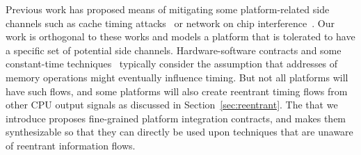 Previous work has proposed means of mitigating some platform-related side channels such as cache timing attacks~\cite{kar2023mitigating,saileshwar2021mirage,giner2023scatter,werner2019scattercache,qureshi2018ceaser} or network on chip interference~\cite{wassel2013surfnoc,wang2012efficient,schoeberl2012statically,wassel2014networks,psarras2015phasenoc,alonso2019low,sadeghi2019toward,shalaby2021sentry}.
Our work is orthogonal to these works and models a platform that is tolerated to have a specific set of potential side channels.
Hardware-software contracts and some constant-time techniques~\cite{guarnieri2021hardware,wang2023specification,tan2025contractshadowlogic} typically consider the assumption that addresses of memory operations might eventually influence timing.
But not all platforms will have such flows, and some platforms will also create reentrant timing flows from other CPU output signals as discussed in Section~\ref{sec:reentrant}.
The \PICI that we introduce proposes fine-grained platform integration contracts, and makes them synthesizable so that they can directly be used upon techniques that are unaware of reentrant information flows.
